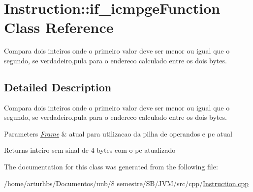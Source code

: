 \hypertarget{classInstruction_1_1if__icmpgeFunction}{}\section{Instruction\+:\+:if\+\_\+icmpge\+Function Class Reference}
\label{classInstruction_1_1if__icmpgeFunction}


Compara dois inteiros onde o primeiro valor deve ser menor ou igual que o segundo, se verdadeiro,pula para o endereco calculado entre os dois bytes.  




\subsection{Detailed Description}
Compara dois inteiros onde o primeiro valor deve ser menor ou igual que o segundo, se verdadeiro,pula para o endereco calculado entre os dois bytes. 


\begin{DoxyParams}{Parameters}
{\em \hyperlink{classFrame}{Frame}} & atual para utilizacao da pilha de operandos e pc atual \\
\hline
\end{DoxyParams}
\begin{DoxyReturn}{Returns}
inteiro sem sinal de 4 bytes com o pc atualizado 
\end{DoxyReturn}


The documentation for this class was generated from the following file\+:\begin{DoxyCompactItemize}
\item 
/home/arturhbs/\+Documentos/unb/8 semestre/\+S\+B/\+J\+V\+M/src/cpp/\hyperlink{Instruction_8cpp}{Instruction.\+cpp}\end{DoxyCompactItemize}
